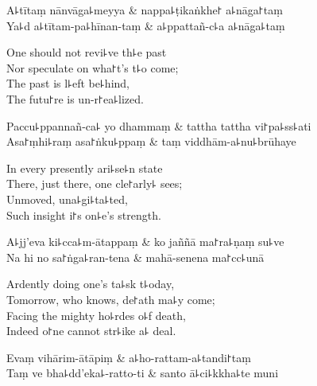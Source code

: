 \begin{twochants}
  A꜕tītaṃ nānvāga꜕meyya & nappa꜕ṭikaṅkhe꜓ a꜕nāga꜓taṃ \\
  Ya꜕d a꜕tītam-pa꜕hīnan-taṃ & a꜕ppattañ-c꜕a a꜕nāga꜕taṃ \\
\end{twochants}

\begin{english}
  One should not revi꜕ve th꜕e past\\
  Nor speculate on wha꜓t's t꜕o come;\\
  The past is l꜕eft be꜕hind,\\
  The futu꜓re is un-r꜓ea꜕lized.
\end{english}

\begin{twochants}
  Paccu꜕ppannañ-ca꜕ yo dhammaṃ & tattha tattha vi꜓pa꜕ss꜕ati \\
  Asa꜓ṃhi꜕raṃ asa꜓ṅku꜕ppaṃ & taṃ viddhām-a꜕nu꜕brūhaye \\
\end{twochants}

\begin{english}
  In every presently ari꜕se꜕n state\\
  There, just there, one cle꜓arly꜕ sees;\\
  Unmoved, una꜕gi꜕ta꜕ted,\\
  Such insight i꜓s on꜕e's strength.
\end{english}

\begin{twochants}
  A꜕jj'eva ki꜕cca꜕m-ātappaṃ & ko jaññā ma꜓ra꜕ṇaṃ su꜕ve \\
  Na hi no sa꜓ṅga꜕ran-tena & mahā-senena ma꜓cc꜕unā \\
\end{twochants}

\begin{english}
  Ardently doing one's ta꜕sk t꜕oday,\\
  Tomorrow, who knows, de꜓ath ma꜕y come;\\
  Facing the mighty ho꜕rdes o꜕f death,\\
  Indeed o꜓ne cannot str꜕ike a꜕ deal.
\end{english}

\begin{twochants}
  Evaṃ vihārim-ātāpiṃ & a꜕ho-rattam-a꜕tandi꜓taṃ \\
  Taṃ ve bha꜕dd'eka꜕-ratto-ti & santo ā꜕ci꜕kkha꜕te muni \\
\end{twochants}

